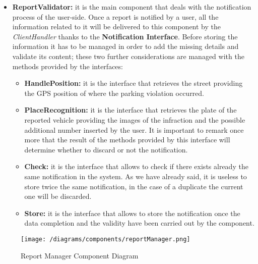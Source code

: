 			\begin{itemize}
				\item \textbf{ReportValidator:} it is the main component that deals with the notification process of the user-side. Once a report is notified by a user, all the information related to it will be delivered to this component by the \emph{ClientHandler} thanks to the \textbf{Notification Interface}. Before storing the information it has to be managed in order to add the missing details and validate its content; these two further considerations are managed with the methods provided by the interfaces:
				
				\begin{itemize}
					\item \textbf{HandlePosition:} it is the interface that retrieves the street providing the GPS position of where the parking violation occurred.
					
					\item \textbf{PlaceRecognition:} it is the interface that retrieves the plate of the reported vehicle providing the images of the infraction and the possible additional number inserted by the user. It is important to remark once more that the result of the methods provided by this interface will determine whether to discard or not the notification.
					
					\item \textbf{Check:} it is the interface that allows to check if there exists already the same notification in the system. As we have already said, it is useless to store twice the same notification, in the case of a duplicate the current one will be discarded.
					
					\item \textbf{Store:} it is the interface that allows to store the notification once the data completion and the validity have been carried out by the component.
				\end{itemize}
			\end{itemize}
			
			\begin{figure}[ht]
				\centering
				\texttt{[image: /diagrams/components/reportManager.png]}
				\caption{\label{fig:reportManagerComp} Report Manager Component Diagram}
			\end{figure}
		
